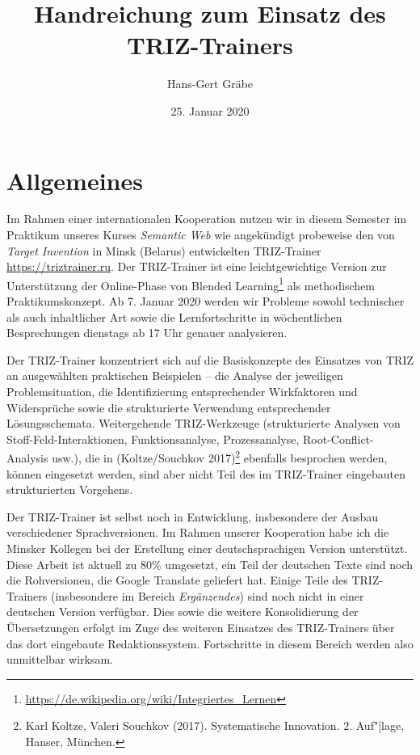 \documentclass[11pt,a4paper]{article}
\title{Handreichung zum Einsatz des TRIZ-Trainers}
\author{Hans-Gert Gr\"abe}
\date{25. Januar 2020}
\begin{document}
\maketitle

\section{Allgemeines}

Im Rahmen einer internationalen Kooperation nutzen wir in diesem Semester im
Praktikum unseres Kurses \emph{Semantic Web} wie angekündigt probeweise den
von \emph{Target Invention} in Minsk (Belarus) entwickelten TRIZ-Trainer
\url{https://triztrainer.ru}.  Der TRIZ-Trainer ist eine leichtgewichtige
Version zur Unterstützung der Online-Phase von Blended
Learning\footnote{\url{https://de.wikipedia.org/wiki/Integriertes_Lernen}} als
methodischem Praktikumskonzept.  Ab 7. Januar 2020 werden wir Probleme sowohl
technischer als auch inhaltlicher Art sowie die Lernfortschritte in
wöchentlichen Besprechungen dienstags ab 17 Uhr genauer analysieren.

Der TRIZ-Trainer konzentriert sich auf die Basiskonzepte des Einsatzes von
TRIZ an ausgewählten praktischen Beispielen -- die Analyse der jeweiligen
Problemsituation, die Identifizierung entsprechender Wirkfaktoren und
Widersprüche sowie die strukturierte Verwendung entsprechender
Lösungsschemata.  Weitergehende TRIZ-Werkzeuge (strukturierte Analysen von
Stoff-Feld-Interaktionen, Funktionsanalyse, Prozessanalyse,
Root-Conflict-Analysis usw.), die in (Koltze/Souchkov 2017)\footnote{Karl
  Koltze, Valeri Souchkov (2017). Systematische Innovation.  2. Auf"|lage,
  Hanser, München.} ebenfalls besprochen werden, können eingesetzt werden,
sind aber nicht Teil des im TRIZ-Trainer eingebauten strukturierten Vorgehens.

Der TRIZ-Trainer ist selbst noch in Entwicklung, insbesondere der Ausbau
verschiedener Sprachversionen.  Im Rahmen unserer Kooperation habe ich die
Minsker Kollegen bei der Erstellung einer deutschsprachigen Version
unterstützt.  Diese Arbeit ist aktuell zu 80\% umgesetzt, ein Teil der
deutschen Texte sind noch die Rohversionen, die Google Translate geliefert
hat.  Einige Teile des TRIZ-Trainers (insbesondere im Bereich
\emph{Ergänzendes}) sind noch nicht in einer deutschen Version verfügbar. Dies
sowie die weitere Konsolidierung der Übersetzungen erfolgt im Zuge des
weiteren Einsatzes des TRIZ-Trainers über das dort eingebaute
Redaktionssystem.  Fortschritte in diesem Bereich werden also unmittelbar
wirksam.
\newpage
\end{document}
